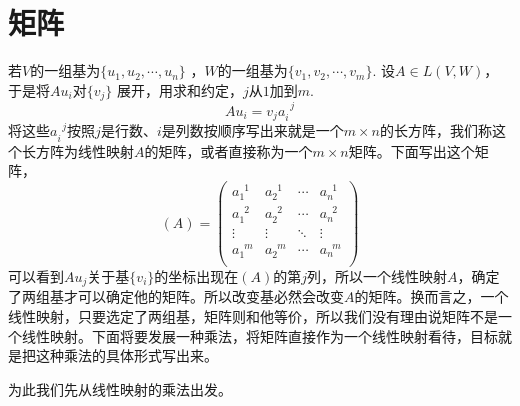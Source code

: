 \documentclass[11pt,a4paper,openany]{book}%
\theoremstyle{plain}%
\begin{document}
\section{矩阵}
若$V$的一组基为$\{u_{1},u_{2},\cdots,u_{n}\}$ ，$W$的一组基为$\{v_{1},v_{2},\cdots,v_{m}\}$.
设$A\in L(V,W)$，于是将$Au_{i}$对$\{v_{j}\}$ 展开，用求和约定，$j$从$1$加到$m$.
$$Au_{i}=v_{j}a_{i}^{\,\,\,j}$$
将这些$a_{i}^{\,\,\,j}$按照$j$是行数、$i$是列数按顺序写出来就是一个$m\times n$的长方阵，我们称这个长方阵为线性映射$A$的矩阵，或者直接称为一个$m\times n$矩阵。下面写出这个矩阵，
\[
(A)=
\begin{pmatrix}
	a_{1}^{\,\,\,1} & a_{2}^{\,\,\,1} & \cdots & a_{n}^{\,\,\,1}\\
	a_{1}^{\,\,\,2} & a_{2}^{\,\,\,2} & \cdots & a_{n}^{\,\,\,2}\\
	\vdots & \vdots & \ddots & \vdots \\
	a_{1}^{\,\,\,m} & a_{2}^{\,\,\,m} & \cdots & a_{n}^{\,\,\,m}\\
\end{pmatrix}
\]
\indent 可以看到$Au_{j}$关于基$\{v_i\}$的坐标出现在$(A)$的第$j$列，所以一个线性映射$A$，确定了两组基才可以确定他的矩阵。所以改变基必然会改变$A$的矩阵。换而言之，一个线性映射，只要选定了两组基，矩阵则和他等价，所以我们没有理由说矩阵不是一个线性映射。下面将要发展一种乘法，将矩阵直接作为一个线性映射看待，目标就是把这种乘法的具体形式写出来。

为此我们先从线性映射的乘法出发。
\end{document}
